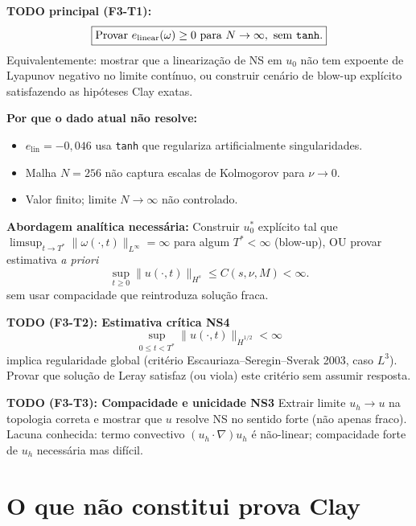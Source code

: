 \documentclass[12pt,a4paper]{article}
\theoremstyle{definition}
\begin{document}
\begin{boxtodo}
\textbf{TODO principal (F3-T1):}
\[
  \boxed{\text{Provar } e_{\mathrm{linear}}(\omega) \ge 0
         \text{ para } N \to \infty, \text{ sem \texttt{tanh}}.}
\]
Equivalentemente: mostrar que a linearização de NS em $u_0$ não
tem expoente de Lyapunov negativo no limite contínuo, ou construir
cenário de blow-up explícito satisfazendo as hipóteses Clay exatas.

\medskip
\textbf{Por que o dado atual não resolve:}
\begin{itemize}
  \item $e_{\mathrm{lin}} = -0{,}046$ usa \texttt{tanh} que
        regulariza artificialmente singularidades.
  \item Malha $N=256$ não captura escalas de Kolmogorov para
        $\nu \to 0$.
  \item Valor finito; limite $N \to \infty$ não controlado.
\end{itemize}

\textbf{Abordagem analítica necessária:}
Construir $u_0^*$ explícito tal que
$\limsup_{t \to T^*} \|\omega(\cdot,t)\|_{L^\infty} = \infty$
para algum $T^* < \infty$ (blow-up), OU provar estimativa
\emph{a priori}
\[
  \sup_{t \ge 0} \|u(\cdot,t)\|_{H^s} \le C(s,\nu,M) < \infty.
\]
sem usar compacidade que reintroduza solução fraca.
\end{boxtodo}

\begin{boxtodo}
\textbf{TODO (F3-T2): Estimativa crítica NS4}
\[
  \sup_{0 \le t < T^*} \|u(\cdot,t)\|_{\dot H^{1/2}} < \infty
\]
implica regularidade global (critério Escauriaza--Seregin--Sverak 2003,
caso $L^3$). Provar que solução de Leray satisfaz (ou viola) este
critério sem assumir resposta.
\end{boxtodo}

\begin{boxtodo}
\textbf{TODO (F3-T3): Compacidade e unicidade NS3}
Extrair limite $u_h \to u$ na topologia correta e mostrar que $u$
resolve NS no sentido forte (não apenas fraco).
Lacuna conhecida: termo convectivo $(u_h \cdot \nabla)u_h$ é
não-linear; compacidade forte de $u_h$ necessária mas difícil.
\end{boxtodo}

\section{O que \textbf{não} constitui prova Clay}
\end{document}
